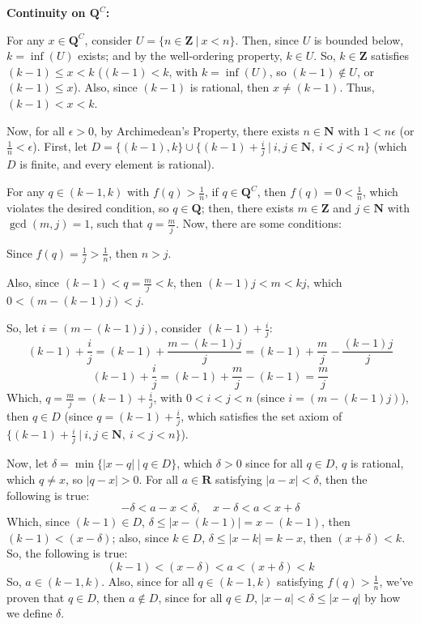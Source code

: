 \documentclass{article}
\begin{document}
\begin{itemize}
    \hfill

    \textbf{Continuity on $\mathbf{Q}^C$:}

    For any $x\in\mathbf{Q}^C$, consider $U = \{n\in\mathbf{Z}\ |\ x <n\}$. Then, since $U$ is bounded below, $k=\inf(U)$ exists; and by the well-ordering property, $k \in U$. So, $k\in \mathbf{Z}$ satisfies $(k-1)\leq x<k$ ($(k-1)<k$, with $k=\inf(U)$, so $(k-1) \notin U$, or $(k-1) \leq x$). Also, since $(k-1)$ is rational, then $x\neq (k-1)$. Thus, $(k-1)<x<k$.

    Now, for all $\epsilon >0$, by Archimedean's Property, there exists $n\in\mathbf{N}$ with $1<n\epsilon$ (or $\frac{1}{n}<\epsilon$). First, let $D = \{(k-1),k\}\cup\{(k-1)+\frac{i}{j}\ |\ i,j\in\mathbf{N},\ i<j<n\}$ (which $D$ is finite, and every element is rational). 

    \hfill
    
    For any $q\in(k-1,k)$ with $f(q) > \frac{1}{n}$, if $q\in\mathbf{Q}^C$, then $f(q)=0 < \frac{1}{n}$, which violates the desired condition, so $q\in\mathbf{Q}$; then, there exists $m\in\mathbf{Z}$ and $j\in\mathbf{N}$ with $\gcd(m,j) = 1$, such that $q=\frac{m}{j}$. Now, there are some conditions:

    Since $f(q) = \frac{1}{j} > \frac{1}{n}$, then $n > j$. 

    Also, since $(k-1)<q=\frac{m}{j}<k$, then $(k-1)j<m<kj$, which $0<(m-(k-1)j) < j$. 
    
    So, let $i=(m-(k-1)j)$, consider $(k-1)+\frac{i}{j}$:
    $$(k-1)+\frac{i}{j}=(k-1)+\frac{m-(k-1)j}{j} = (k-1)+\frac{m}{j}-\frac{(k-1)j}{j}$$
    $$(k-1)+\frac{i}{j} = (k-1)+\frac{m}{j}-(k-1) = \frac{m}{j}$$
    Which, $q=\frac{m}{j}=(k-1)+\frac{i}{j}$, with $0<i<j<n$ (since $i=(m-(k-1)j)$), then $q \in D$ (since $q = (k-1)+\frac{i}{j}$, which satisfies the set axiom of $\{(k-1)+\frac{i}{j}\ |\ i,j\in\mathbf{N},\ i<j<n\}$).

    \hfill
    
    Now, let $\delta = \min\{|x-q|\ |\ q\in D\}$, which $\delta >0$ since for all $q\in D$, $q$ is rational, which $q\neq x$, so $|q-x| >0$. For all $a\in\mathbf{R}$ satisfying $|a-x|<\delta$, then the following is true:
    $$-\delta < a-x < \delta,\quad x-\delta < a < x+\delta$$
    Which, since $(k-1) \in D$, $\delta \leq |x-(k-1)| = x-(k-1)$, then $(k-1) < (x-\delta)$; also, since $k\in D$, $\delta \leq |x-k| = k-x$, then $(x+\delta)<k$. So, the following is true:
    $$(k-1) < (x-\delta) < a < (x+\delta) < k$$
    So, $a \in (k-1,k)$. Also, since for all $q \in (k-1,k)$ satisfying $f(q) > \frac{1}{n}$, we've proven that $q \in D$, then $a \notin D$, since for all $q\in D$, $|x-a| < \delta \leq |x-q|$ by how we define $\delta$.


\end{itemize}
\end{document}
